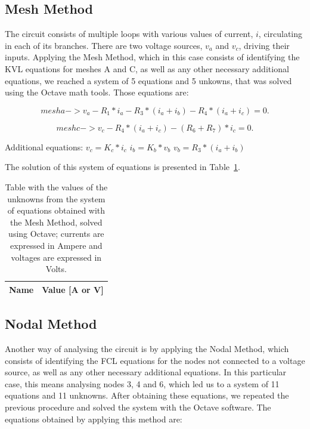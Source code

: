 \subsection{Mesh Method}

The circuit consists of multiple loops with various values of current, $i$, circulating in each of its branches. There are two
voltage sources, $v_a$ and $v_c$, driving their inputs. Applying the Mesh Method, which in this case consists of identifying the KVL equations for meshes A and C, as well as any other necessary additional equations, we reached a system of 5 equations and 5 unkowns, that was solved using the Octave math tools. Those equations are:

\begin{equation}
  mesh a -> v_a - R_1*i_a - R_3*(i_a + i_b) - R_4*(i_a +i_c) = 0.
\end{equation}

\begin{equation}
  mesh c -> v_c - R_4*(i_a +i_c) - (R_6 +R_7)*i_c = 0.
\end{equation}

Additional equations:
$v_c = K_c*i_c$
$i_b = K_b*v_b$
$v_b = R_3*(i_a + i_b)$

The solution of this system of equations is presented in Table~\ref{tab:node}. 

\begin{table}[h]
  \centering
  \begin{tabular}{|l|r|}
    \hline    
    {\bf Name} & {\bf Value [A or V]} \\ \hline
    
  \end{tabular}
  \caption{Table with the values of the unknowns from the system of equations obtained with the Mesh Method, solved using Octave; currents are expressed in Ampere and voltages are expressed in Volts.}
  \label{tab:node}
\end{table}


\subsection{Nodal Method}

Another way of analysing the circuit is by applying the Nodal Method, which consists of identifying the FCL equations for the nodes not connected to a voltage source, as well as any other necessary additional equations. In this particular case, this means analysing nodes 3, 4 and 6, which led us to a system of 11 equations and 11 unknowns. After obtaining these equations, we repeated the previous procedure and solved the system with the Octave software. The equations obtained by applying this method are:


